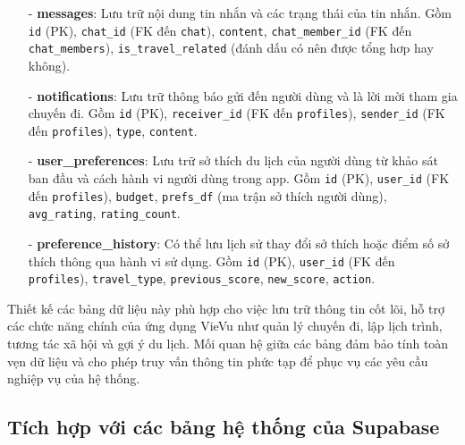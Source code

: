 \begin{itemize}
    \item[-] \textbf{messages}: Lưu trữ nội dung tin nhắn và các trạng thái của tin nhắn. Gồm \texttt{id} (PK), \texttt{chat\_id} (FK đến \texttt{chat}), \texttt{content}, \texttt{chat\_member\_id} (FK đến \texttt{chat\_members}), \texttt{is\_travel\_related} (đánh dấu có nên được tổng hơp hay không).


    \item[-] \textbf{notifications}: Lưu trữ thông báo gửi đến người dùng và là lời mời tham gia chuyến đi. Gồm \texttt{id} (PK), \texttt{receiver\_id} (FK đến \texttt{profiles}), \texttt{sender\_id} (FK đến \texttt{profiles}), \texttt{type}, \texttt{content}.

    \item[-] \textbf{user\_preferences}: Lưu trữ sở thích du lịch của người dùng từ khảo sát ban đầu và cách hành vi người dùng trong app. Gồm \texttt{id} (PK), \texttt{user\_id} (FK đến \texttt{profiles}), \texttt{budget}, \texttt{prefs\_df} (ma trận sở thích người dùng), \texttt{avg\_rating}, \texttt{rating\_count}.

    \item[-] \textbf{preference\_history}: Có thể lưu lịch sử thay đổi sở thích hoặc điểm số sở thích thông qua hành vi sử dụng. Gồm \texttt{id} (PK), \texttt{user\_id} (FK đến \texttt{profiles}), \texttt{travel\_type}, \texttt{previous\_score}, \texttt{new\_score}, \texttt{action}.


   
\end{itemize}

Thiết kế các bảng dữ liệu này phù hợp cho việc lưu trữ thông tin cốt lõi, hỗ trợ các chức năng chính của ứng dụng VieVu như quản lý chuyến đi, lập lịch trình, tương tác xã hội và gợi ý du lịch. Mối quan hệ giữa các bảng đảm bảo tính toàn vẹn dữ liệu và cho phép truy vấn thông tin phức tạp để phục vụ các yêu cầu nghiệp vụ của hệ thống.


\subsection{Tích hợp với các bảng hệ thống của Supabase}


